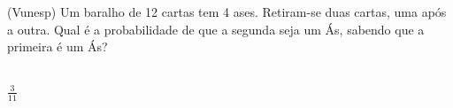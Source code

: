 \begin{ex}
(Vunesp) Um baralho de 12 cartas tem 4 ases. Retiram-se duas cartas, uma após a outra. Qual é a probabilidade de que a segunda seja um Ás, sabendo que a primeira é um Ás?
  \begin{sol}
   \phantom{A} \\
   $\frac{3}{11}$
  \end{sol}
\end{ex}